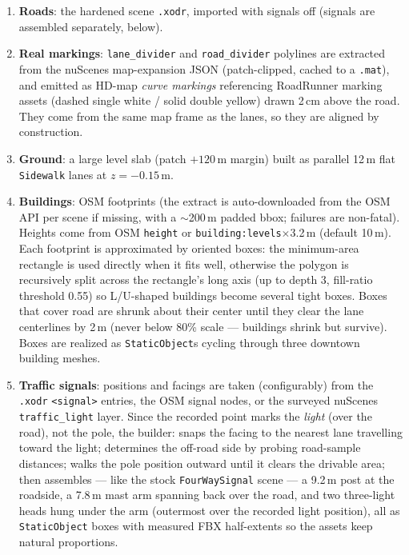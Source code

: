 \documentclass[11pt]{article}
\newcommand{\code}[1]{{\setlength{\fboxsep}{1.5pt}\colorbox{codegray}{\small\texttt{#1}}}}
\newcommand{\file}[1]{\texttt{#1}}
\begin{document}
\begin{enumerate}
\item \textbf{Roads}: the hardened scene \file{.xodr}, imported with signals off
      (signals are assembled separately, below).
\item \textbf{Real markings}: \code{lane\_divider} and \code{road\_divider} polylines
      are extracted from the nuScenes map-expansion JSON (patch-clipped, cached to a
      \file{.mat}), and emitted as HD-map \emph{curve markings} referencing RoadRunner
      marking assets (dashed single white / solid double yellow) drawn 2\,cm above the
      road. They come from the same map frame as the lanes, so they are aligned by
      construction.
\item \textbf{Ground}: a large level slab (patch $+120$\,m margin) built as parallel
      12\,m flat \code{Sidewalk} lanes at $z=-0.15$\,m.
\item \textbf{Buildings}: OSM footprints (the extract is auto-downloaded from the OSM
      API per scene if missing, with a $\sim$200\,m padded bbox; failures are
      non-fatal). Heights come from OSM \code{height} or
      \code{building:levels}$\times$3.2\,m (default 10\,m). Each footprint is
      approximated by oriented boxes: the minimum-area rectangle is used directly when
      it fits well, otherwise the polygon is recursively split across the rectangle's
      long axis (up to depth 3, fill-ratio threshold 0.55) so L/U-shaped buildings
      become several tight boxes. Boxes that cover road are shrunk about their center
      until they clear the lane centerlines by 2\,m (never below 80\% scale ---
      buildings shrink but survive). Boxes are realized as \code{StaticObject}s cycling
      through three downtown building meshes.
\item \textbf{Traffic signals}: positions and facings are taken (configurably) from the
      \file{.xodr} \code{<signal>} entries, the OSM signal nodes, or the surveyed
      nuScenes \code{traffic\_light} layer. Since the recorded point marks the
      \emph{light} (over the road), not the pole, the builder: snaps the facing to the
      nearest lane travelling toward the light; determines the off-road side by probing
      road-sample distances; walks the pole position outward until it clears the
      drivable area; then assembles --- like the stock \file{FourWaySignal} scene --- a
      9.2\,m post at the roadside, a 7.8\,m mast arm spanning back over the road, and
      two three-light heads hung under the arm (outermost over the recorded light
      position), all as \code{StaticObject} boxes with measured FBX half-extents so the
      assets keep natural proportions.
\end{enumerate}
\end{document}

